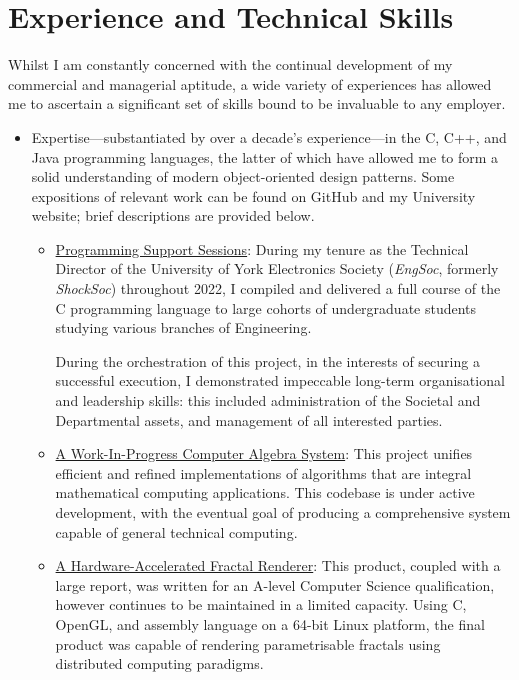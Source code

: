 \documentclass[final]{article}
\newcommand\githublink[2]{\href{https://github.com/oliverdixon/#1}{#2}}
\newcommand\weblink[2]{\href{https://www-users.york.ac.uk/~od641/#1}{#2}}
\begin{document}
\section{Experience and Technical Skills}
Whilst I am constantly concerned with the continual development of my commercial
and managerial aptitude, a wide variety of experiences has allowed me to
ascertain a significant set of skills bound to be invaluable to any employer.
\begin{itemize}
  \item Expertise---substantiated by over a decade's experience---in the C, C++,
  and Java programming languages, the latter of which have allowed me to form a
  solid understanding of modern object-oriented design patterns. Some
  expositions of relevant work can be found on GitHub and my University website;
  brief descriptions are provided below.
  \begin{itemize}
    \item \weblink{pss}{Programming Support Sessions}: During my tenure as the
    Technical Director of the University of York Electronics Society
    (\textit{EngSoc}, formerly \textit{ShockSoc}) throughout 2022, I compiled
    and delivered a full course of the C programming language to large cohorts
    of undergraduate students studying various branches of Engineering.

    During the orchestration of this project, in the interests of securing a
    successful execution, I demonstrated impeccable long-term organisational and
    leadership skills: this included administration of the Societal and
    Departmental assets, and management of all interested parties.

    \item \githublink{calculator-demo}{A Work-In-Progress Computer Algebra
    System}: This project unifies efficient and refined implementations of
    algorithms that are integral mathematical computing applications.  This
    codebase is under active development, with the eventual goal of producing a
    comprehensive system capable of general technical computing.

    \item \weblink{fractal}{A Hardware-Accelerated Fractal Renderer}: This
    product, coupled with a large report, was written for an A-level Computer
    Science qualification, however continues to be maintained in a limited
    capacity. Using C, OpenGL, and assembly language on a 64-bit Linux platform,
    the final product was capable of rendering parametrisable fractals using
    distributed computing paradigms.


\end{itemize}
\end{itemize}
\end{document}
